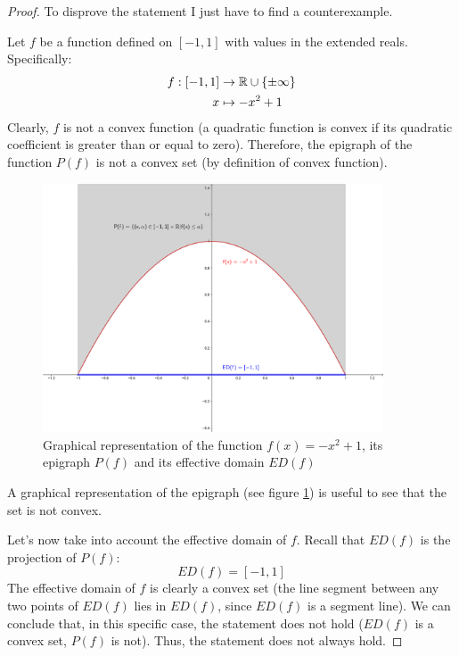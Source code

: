 \begin{proof}
    To disprove the statement I just have to find a counterexample.\par
    Let \(f\) be a function defined on \([-1,1]\) with values in the extended reals. Specifically:
    \begin{align*}
        f:[-1,1] &\rightarrow \mathbb{R} \cup \{\pm\infty\} \\
        x &\mapsto -x^2 + 1
    \end{align*}
    Clearly, \(f\) is not a convex function (a quadratic function is convex if its quadratic coefficient is greater than or equal to zero). Therefore, the epigraph of the function \(P(f)\) is not a convex set (by definition of convex function).
    \begin{figure}
        \centering
        \includegraphics[width=0.9\textwidth]{../Images/epigraph_effectivedomain.png}
        \caption{Graphical representation of the function \(f(x) = -x^2 + 1\), its epigraph \(P(f)\) and its effective domain \(ED(f)\)}
        \label{epigraph_effectivedomain}
    \end{figure}
    A graphical representation of the epigraph (see figure \ref{epigraph_effectivedomain}) is useful to see that the set is not convex.\par
    Let's now take into account the effective domain of \(f\). Recall that \(ED(f)\) is the projection of \(P(f)\):
    \[ED(f) = [-1,1]\]
    The effective domain of \(f\) is clearly a convex set (the line segment between any two points of \(ED(f)\) lies in \(ED(f)\), since \(ED(f)\) is a segment line). We can conclude that, in this specific case, the statement does not hold (\(ED(f)\) is a convex set, \(P(f)\) is not). Thus, the statement does not always hold.
\end{proof}